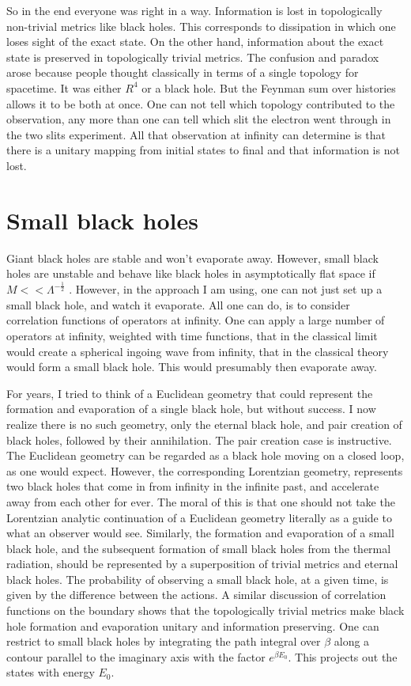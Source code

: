 \documentclass[aps,prd,groupedaddress,showpacs]{revtex4}
\begin{document}
So in the end everyone was right in a way. Information is lost in topologically non-trivial metrics like black holes. This corresponds to dissipation in which one loses sight of the exact state. On the other hand, information about the exact state is preserved in topologically trivial metrics. The confusion and paradox arose because people thought classically in terms of a single topology for spacetime. It was either $R^4$ or a black hole. But the Feynman sum over histories allows it to be both at once. One can not tell which topology contributed to the observation, any more than one can tell which slit the electron went through in the two slits experiment. All that observation at infinity can determine is that there is a unitary mapping from initial states to final and that information is not lost. 

\section{Small black holes} 

Giant black holes are stable and won't evaporate away. However, small black holes are unstable and behave like black holes in asymptotically flat space if $M << \Lambda^{-\frac{1}{2}}$ \cite{HawkingPage}. However, in the approach I am using, one can not just set up a small black hole, and watch it evaporate. All one can do, is to consider correlation functions of operators at infinity. One can apply a large number of operators at infinity, weighted with time functions, that in the classical limit would create a spherical ingoing wave from infinity, that in the classical theory would form a small black hole. This would presumably then evaporate away. 

For years, I tried to think of a Euclidean geometry that could represent the formation and evaporation of a single black hole, but without success. I now realize there is no such geometry, only the eternal black hole, and pair creation of black holes, followed by their annihilation. The pair creation case is instructive. The Euclidean geometry can be regarded as a black hole moving on a closed loop, as one would expect. However, the corresponding Lorentzian geometry, represents two black holes that come in from infinity in the infinite past, and accelerate away from each other for ever. The moral of this is that one should not take the Lorentzian analytic continuation of a Euclidean geometry literally as a guide to what an observer would see. Similarly, the formation and evaporation of a small black hole, and the subsequent formation of small black holes from the thermal radiation, should  be represented  by a superposition of trivial metrics and eternal black holes. The probability of observing a small black hole, at a given time, is given by the difference  between the actions. A similar discussion of correlation functions on the boundary shows that the topologically trivial metrics make black hole formation and evaporation unitary and information preserving.
One can restrict to small black holes by integrating the path integral over 
$\beta$ along a contour parallel to the imaginary axis with the factor $e^{\beta E_0}$. This projects  out the states with energy 
$E_0$. 
\end{document}
